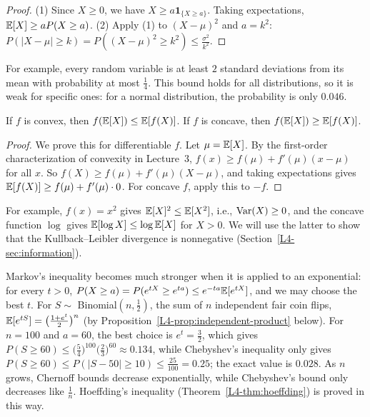 \begin{proof}
    (1) Since $X \geq 0$, we have $X \geq a\mathbf{1}_{\{X \geq a\}}$. Taking expectations, $\mathbb{E}[X] \geq a P(X \geq a)$. (2) Apply (1) to $(X - \mu)^2$ and $a = k^2$: $P(|X - \mu| \geq k) = P((X - \mu)^2 \geq k^2) \leq \frac{\sigma^2}{k^2}$.
\end{proof}

For example, every random variable is at least $2$ standard deviations from its mean with probability at most $\frac{1}{4}$. This bound holds for all distributions, so it is weak for specific ones: for a normal distribution, the probability is only $0.046$.

\begin{theorem}\label{L4-thm:jensen}
    If $f$ is convex, then $f(\mathbb{E}[X]) \leq \mathbb{E}[f(X)]$. If $f$ is concave, then $f(\mathbb{E}[X]) \geq \mathbb{E}[f(X)]$.
\end{theorem}

\begin{proof}
    We prove this for differentiable $f$. Let $\mu = \mathbb{E}[X]$. By the first-order characterization of convexity in Lecture~3, $f(x) \geq f(\mu) + f'(\mu)(x - \mu)$ for all $x$. So $f(X) \geq f(\mu) + f'(\mu)(X - \mu)$, and taking expectations gives $\mathbb{E}[f(X)] \geq f(\mu) + f'(\mu) \cdot 0$. For concave $f$, apply this to $-f$.
\end{proof}

For example, $f(x) = x^2$ gives $\mathbb{E}[X]^2 \leq \mathbb{E}[X^2]$, i.e., $\operatorname{Var}(X) \geq 0$, and the concave function $\log$ gives $\mathbb{E}[\log X] \leq \log\mathbb{E}[X]$ for $X > 0$. We will use the latter to show that the Kullback--Leibler divergence is nonnegative (Section~\ref{L4-sec:information}).

\begin{example}\label{L4-ex:chernoff}
    Markov's inequality becomes much stronger when it is applied to an exponential: for every $t > 0$, $P(X \geq a) = P(e^{tX} \geq e^{ta}) \leq e^{-ta}\mathbb{E}[e^{tX}]$, and we may choose the best $t$. For $S \sim$ Binomial$(n, \frac{1}{2})$, the sum of $n$ independent fair coin flips, $\mathbb{E}[e^{tS}] = \big(\frac{1 + e^t}{2}\big)^n$ (by Proposition~\ref{L4-prop:independent-product} below). For $n = 100$ and $a = 60$, the best choice is $e^t = \frac{3}{2}$, which gives $P(S \geq 60) \leq \big(\frac{5}{4}\big)^{100}\big(\frac{2}{3}\big)^{60} \approx 0.134$, while Chebyshev's inequality only gives $P(S \geq 60) \leq P(|S - 50| \geq 10) \leq \frac{25}{100} = 0.25$; the exact value is $0.028$. As $n$ grows, Chernoff bounds decrease exponentially, while Chebyshev's bound only decreases like $\frac{1}{n}$. Hoeffding's inequality (Theorem~\ref{L4-thm:hoeffding}) is proved in this way.
\end{example}

